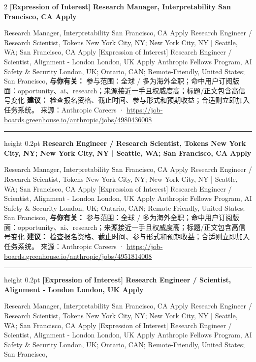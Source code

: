 \documentclass[10.5pt]{ctexart}
\begin{document}
\begin{multicols}{2}
{\large\bfseries [Expression of Interest] Research Manager, Interpretability San Francisco, CA Apply}\par
[Expression of Interest] Research Manager, Interpretability San Francisco, CA Apply Research Engineer / Research Scientist, Tokens New York City, NY; New York City, NY | Seattle, WA; San Francisco, CA Apply [Expression of Interest] Research Engineer / Scientist, Alignment - London London, UK Apply Anthropic Fellows Program, AI Safety \& Security London, UK; Ontario, CAN; Remote-Friendly, United States; San Francisco, 
\textbf{与你有关：} 参与范围：全球 / 多为海外全职；命中用户订阅版面：opportunity、ai、research；来源接近一手且权威度高；标题/正文包含高信号变化
\textbf{建议：} 检查报名资格、截止时间、参与形式和预期收益；合适则立即加入任务系统。
{\footnotesize\color{ormuted} 来源：Anthropic Careers · \url{https://job-boards.greenhouse.io/anthropic/jobs/4980436008}}
\vspace{2mm}
\hrule height 0.2pt
\vspace{2mm}
{\large\bfseries Research Engineer / Research Scientist, Tokens New York City, NY; New York City, NY | Seattle, WA; San Francisco, CA Apply}\par
[Expression of Interest] Research Manager, Interpretability San Francisco, CA Apply Research Engineer / Research Scientist, Tokens New York City, NY; New York City, NY | Seattle, WA; San Francisco, CA Apply [Expression of Interest] Research Engineer / Scientist, Alignment - London London, UK Apply Anthropic Fellows Program, AI Safety \& Security London, UK; Ontario, CAN; Remote-Friendly, United States; San Francisco, 
\textbf{与你有关：} 参与范围：全球 / 多为海外全职；命中用户订阅版面：opportunity、ai、research；来源接近一手且权威度高；标题/正文包含高信号变化
\textbf{建议：} 检查报名资格、截止时间、参与形式和预期收益；合适则立即加入任务系统。
{\footnotesize\color{ormuted} 来源：Anthropic Careers · \url{https://job-boards.greenhouse.io/anthropic/jobs/4951814008}}
\vspace{2mm}
\hrule height 0.2pt
\vspace{2mm}
{\large\bfseries [Expression of Interest] Research Engineer / Scientist, Alignment - London London, UK Apply}\par
[Expression of Interest] Research Manager, Interpretability San Francisco, CA Apply Research Engineer / Research Scientist, Tokens New York City, NY; New York City, NY | Seattle, WA; San Francisco, CA Apply [Expression of Interest] Research Engineer / Scientist, Alignment - London London, UK Apply Anthropic Fellows Program, AI Safety \& Security London, UK; Ontario, CAN; Remote-Friendly, United States; San Francisco, 

\end{multicols}
\end{document}
